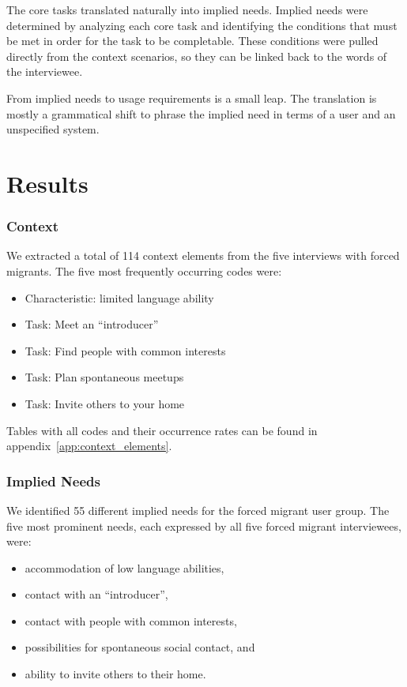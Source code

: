 The core tasks translated naturally into implied needs. Implied needs were determined by analyzing each core task and identifying the conditions that must be met in order for the task to be completable. These conditions were pulled directly from the context scenarios, so they can be linked back to the words of the interviewee.

From implied needs to usage requirements is a small leap. The translation is mostly a grammatical shift to phrase the implied need in terms of a user and an unspecified system.


\section{Results}
\label{sec:needs-results}

\subsubsection*{Context}

We extracted a total of 114 context elements from the five interviews with forced migrants. The five most frequently occurring codes were:

\begin{itemize}
    \item Characteristic: limited language ability
    \item Task: Meet an ``introducer''
    \item Task: Find people with common interests
    \item Task: Plan spontaneous meetups
    \item Task: Invite others to your home
\end{itemize}

Tables with all codes and their occurrence rates can be found in appendix~\ref{app:context_elements}.

\subsubsection*{Implied Needs}

We identified 55 different implied needs for the forced migrant user group. The five most prominent needs, each expressed by all five forced migrant interviewees, were:

\begin{itemize}
    \item accommodation of low language abilities,
    \item contact with an ``introducer'',
    \item contact with people with common interests,
    \item possibilities for spontaneous social contact, and
    \item ability to invite others to their home.
\end{itemize}

